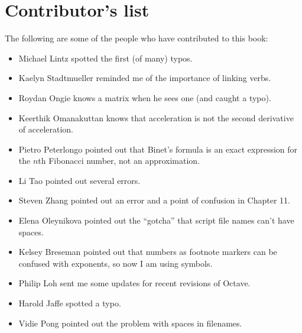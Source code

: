 \vspace{0.1in}

\section*{Contributor's list}

The following are some of the people who have contributed to this
book:

\begin{itemize}

\item Michael Lintz spotted the first (of many) typos.

\item Kaelyn Stadtmueller reminded me of the importance of linking
verbs.

\item Roydan Ongie knows a matrix when he sees one (and caught a typo).

\item Keerthik Omanakuttan knows that acceleration is not the
second derivative of acceleration.

\item Pietro Peterlongo pointed out that Binet's formula is an
exact expression for the $n$th Fibonacci number, not an approximation.

\item Li Tao pointed out several errors.

\item Steven Zhang pointed out an error and a point of confusion
in Chapter 11.

\item Elena Oleynikova pointed out the ``gotcha'' that script file names
can't have spaces.

\item Kelsey Breseman pointed out that numbers as footnote markers
can be confused with exponents, so now I am using symbols.

\item Philip Loh sent me some updates for recent revisions of Octave.

\item Harold Jaffe spotted a typo.

\item Vidie Pong pointed out the problem with spaces in filenames.

\end{itemize}

